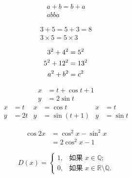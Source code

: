 \documentclass{ctexart}%
\begin{document}
	
	\begin{gather}
		a + b = b + a \\
		ab ba
	\end{gather}
	
	\begin{gather*}
	3+5 = 5+3 = 8 \\
	3 \times 5 = 5 \times 3
	\end{gather*}
	
	\begin{gather}
		3^2 + 4^2 = 5^2 \notag \\
		5^2 + 12^2 = 13^2 \notag \\
		a^2 + b^2 = c^2 
	\end{gather}
	
	\begin{align}
	x &= t + \cos t + 1 \\
	y &= 2\sin t
	\end{align}
	\begin{align*}
		x &= t & x &= \cos t & x &= t \\
		y &= 2t & y &= \sin(t+1) & y &= \sin t 
	\end{align*}
	
	\begin{equation}
	\begin{split}
	\cos 2x &= \cos^2 x - \sin^2 x \\
	&= 2\cos^2 x - 1
	\end{split}
	\end{equation}
	
	\begin{equation}
		D(x) = \begin{cases}
		1, & \text{如果 } x \in \mathbb{Q}; \\ %
		0, & \text{如果 } x \in \mathbb{R}\setminus\mathbb{Q}.
		\end{cases}
	\end{equation} 
\end{document}
